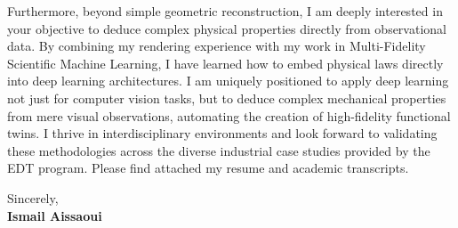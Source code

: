 \documentclass[11pt,a4paper]{article}
\begin{document}
\vspace{0.5em}
\noindent
Furthermore, beyond simple geometric reconstruction, I am deeply interested in your objective to deduce complex physical properties directly from observational data. By combining my rendering experience with my work in Multi-Fidelity Scientific Machine Learning, I have learned how to embed physical laws directly into deep learning architectures. I am uniquely positioned to apply deep learning not just for computer vision tasks, but to deduce complex mechanical properties from mere visual observations, automating the creation of high-fidelity functional twins. I thrive in interdisciplinary environments and look forward to validating these methodologies across the diverse industrial case studies provided by the EDT program. Please find attached my resume and academic transcripts.

\vspace{1.5em}
\noindent
Sincerely, \\[0.5em]
\textbf{Ismail Aissaoui}
\end{document}
